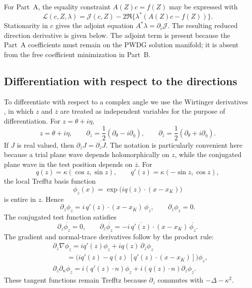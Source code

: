 \documentclass[pdflatex,sn-mathphys-num]{sn-jnl}
\theoremstyle{thmstyleone}
\theoremstyle{thmstyletwo}
\begin{document}
For Part~A, the equality constraint $A(Z)c=f(Z)$ may be expressed with
\[
 \mathcal L(c,Z,\lambda)
 =\mathcal J(c,Z)-2\Re\{\lambda^*(A(Z)c-f(Z))\}.
\]
Stationarity in $c$ gives the adjoint equation $A^*\lambda=\partial_{\bar c}\mathcal J$.  The resulting reduced direction derivative is given below.  The adjoint term is present because the Part~A coefficients must remain on the PWDG solution manifold; it is absent from the free coefficient minimization in Part~B.

\subsection{Differentiation with respect to the directions}\label{subsec:wirtinger}
To differentiate with respect to a complex angle we use the Wirtinger derivatives \cite{HjorungnesGesbert2007}, in which $z$ and $\overline z$ are treated as independent variables for the purpose of differentiation.  For $z=\theta+i\eta$,
\[
 z=\theta+i\eta,
 \qquad
 \partial_z=\frac12(\partial_\theta-i\partial_\eta),
 \qquad
 \partial_{\overline z}=\frac12(\partial_\theta+i\partial_\eta).
\]
If $J$ is real valued, then $\partial_{\overline z}J=\overline{\partial_zJ}$.  The notation is particularly convenient here because a trial plane wave depends holomorphically on $z$, while the conjugated plane wave in the test position depends on $\overline z$.
For
\[
 q(z)=\kappa(\cos z,\sin z),
 \qquad
 q'(z)=\kappa(-\sin z,\cos z),
\]
the local Trefftz basis function
\[
 \phi_z(x)=\exp\!\big(iq(z)\cdot(x-x_K)\big)
\]
is entire in $z$.  Hence
\begin{equation}\label{eq:phi-wirt}
 \partial_z\phi_z
 =i\,q'(z)\cdot(x-x_K)\,\phi_z,
 \qquad
 \partial_{\overline z}\phi_z=0.
\end{equation}
The conjugated test function satisfies
\begin{equation}\label{eq:phibar-wirt}
 \partial_z\overline{\phi_z}=0,
 \qquad
 \partial_{\overline z}\overline{\phi_z}
 =-i\,\overline{q'(z)}\cdot(x-x_K)\,\overline{\phi_z}.
\end{equation}
The gradient and normal-trace derivatives follow by the product rule:
\begin{align}
 &\partial_z\nabla\phi_z
 =i q'(z)\phi_z+i q(z)\,\partial_z\phi_z\nonumber\\
 &\hspace{2em}=\Big(iq'(z)-q(z)\,[q'(z)\cdot(x-x_K)]\Big)\phi_z,\label{eq:gradphi-wirt}\\
 &\partial_z\partial_n\phi_z
 =i(q'(z)\cdot n)\phi_z+i(q(z)\cdot n)\partial_z\phi_z.\label{eq:nphi-wirt}
\end{align}
These tangent functions remain Trefftz because $\partial_z$ commutes with $-\Delta-\kappa^2$.
\end{document}
